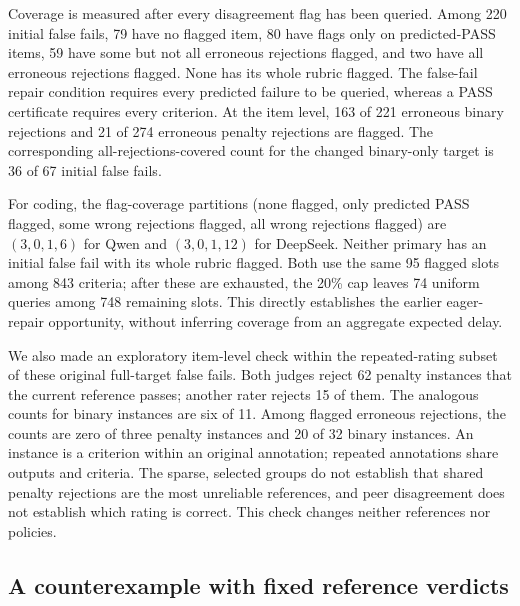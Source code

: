 Coverage is measured after every disagreement flag has been queried. Among
220 initial false fails, 79 have no flagged item, 80 have flags only on
predicted-PASS items, 59 have some but not all erroneous rejections flagged,
and two have all erroneous rejections flagged. None has its whole rubric
flagged. The false-fail repair condition requires every predicted failure
to be queried, whereas a PASS certificate requires every criterion. At the
item level, 163 of 221 erroneous binary rejections and 21 of 274 erroneous
penalty rejections are flagged. The corresponding all-rejections-covered
count for the changed binary-only target is 36 of 67 initial false fails.

For coding, the flag-coverage partitions (none flagged, only predicted PASS flagged, some wrong rejections flagged, all wrong rejections flagged) are $(3,0,1,6)$ for Qwen and $(3,0,1,12)$ for DeepSeek. Neither primary has an initial false fail with its whole rubric flagged. Both use the same 95 flagged slots among 843 criteria; after these are exhausted, the 20\% cap leaves 74 uniform queries among 748 remaining slots. This directly establishes the earlier eager-repair opportunity, without inferring coverage from an aggregate expected delay.

We also made an exploratory item-level check within the repeated-rating
subset of these original full-target false fails. Both judges reject 62
penalty instances that the current reference passes; another rater rejects
15 of them. The analogous counts for binary instances are six of 11.
Among flagged erroneous rejections, the counts are zero of three penalty
instances and 20 of 32 binary instances. An instance is a criterion within
an original annotation; repeated annotations share outputs and criteria.
The sparse, selected groups do not establish that shared penalty rejections
are the most unreliable references, and peer disagreement does not establish
which rating is correct. This check changes neither references nor policies.

\subsection{A counterexample with fixed reference verdicts}
\label{app:fixed-verdict}

